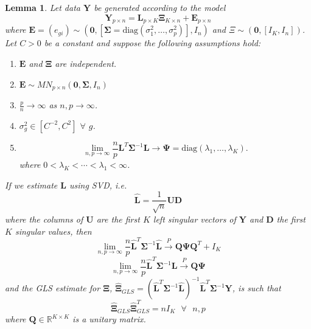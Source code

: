 \documentclass{article}
\newtheorem{lemma}[theorem]{Lemma}
\begin{document}
\begin{lemma}
Let data $\bm{Y}$ be generated according to the model
\begin{equation}
\bm{Y}_{p \times n} = \bm{L}_{p \times K}\bm{\Xi}_{K \times n} + \bm{E}_{p \times n}
\end{equation}
where $\bm{E} = (e_{gi}) \sim \left( \bm{0}, \left[ \bm{\Sigma} = \text{diag}\left( \sigma_1^2, \ldots, \sigma_p^2 \right) \right], I_n \right)$ and $\Xi \sim \left( \bm{0},\left[I_K, I_n \right] \right)$. Let $C > 0$ be a constant and suppose the following assumptions hold:
\begin{enumerate}
\item $\bm{E}$ and $\bm{\Xi}$ are independent.
\item $\bm{E} \sim MN_{p \times n}\left( \bm{0}, \bm{\Sigma}, I_n \right)$
\item $\frac{p}{n} \to \infty$ as $n, p \to \infty$.
\item $\sigma_{g}^2 \in \left[ C^{-2}, C^2 \right]$ $\forall$ $g$.
\item
\begin{equation}
\lim_{n, p \to \infty} \frac{n}{p} \bm{L}^T \bm{\Sigma}^{-1}\bm{L} \to \bm{\Psi} = \text{diag}\left( \lambda_1, \ldots, \lambda_K \right).
\end{equation}
where $0 < \lambda_K < \cdots < \lambda_1 < \infty$.
\end{enumerate}

If we estimate $\bm{L}$ using SVD, i.e. 
\begin{equation}
\hat{\bm{L}} = \frac{1}{\sqrt{n}}\bm{U}\bm{D}
\end{equation}
where the columns of $\bm{U}$ are the first $K$ left singular vectors of $\bm{Y}$ and $\bm{D}$ the first $K$ singular values, then
\begin{equation}
\lim_{n,p \to \infty} \frac{n}{p}\hat{\bm{L}}^T \bm{\Sigma}^{-1}\hat{\bm{L}} \stackrel{P}{\to} \bm{Q}\bm{\Psi}\bm{Q}^T + I_K
\end{equation}
\begin{equation}
\lim_{n,p \to \infty} \frac{n}{p}\hat{\bm{L}}^T \bm{\Sigma}^{-1}\bm{L} \stackrel{P}{\to} \bm{Q}\bm{\Psi}
\end{equation}
and the GLS estimate for $\bm{\Xi}$, $\hat{\bm{\Xi}}_{GLS} = \left( \hat{\bm{L}}^T \bm{\Sigma}^{-1}\hat{\bm{L}} \right)^{-1}\hat{\bm{L}}^T \bm{\Sigma}^{-1}\bm{Y}$, is such that
\begin{equation}
\hat{\bm{\Xi}}_{GLS} \hat{\bm{\Xi}}_{GLS}^T = n I_K \text{ } \forall \text{ } n, p
\end{equation}
where $\bm{Q} \in \mathbb{R}^{K \times K}$ is a unitary matrix.
\end{lemma}
\end{document}
